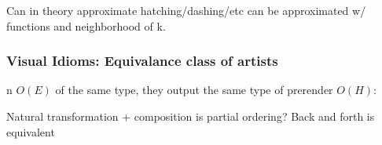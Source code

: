 \documentclass[../main.tex]{subfiles}
\begin{document}









 Can in theory approximate hatching/dashing/etc can be approximated w/ functions and neighborhood of k. 


\subsubsection{Visual Idioms: Equivalance class of artists}
n $O(E)$ of the same type, they output the same type of prerender $O(H)$:


Natural transformation + composition is partial ordering? Back and forth is equivalent 
\end{document}
